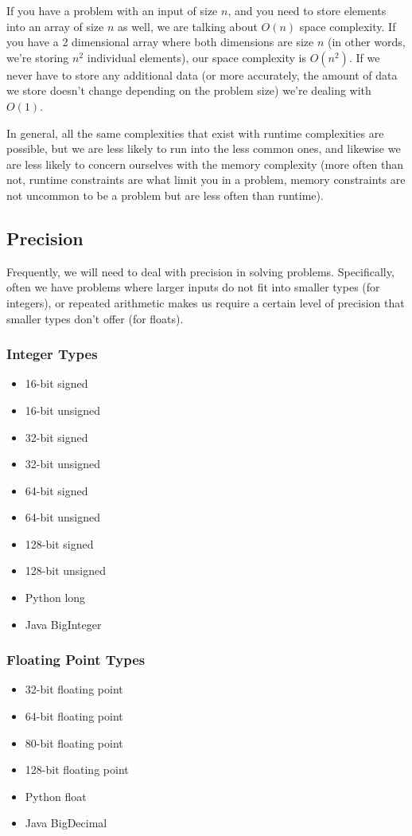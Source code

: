 If you have a problem with an input of size $n$, and you need to store elements into an array of size $n$ as well, we are talking about $O(n)$ space complexity. If you have a 2 dimensional array where both dimensions are size $n$ (in other words, we're storing $n^2$ individual elements), our space complexity is $O(n^2)$. If we never have to store any additional data (or more accurately, the amount of data we store doesn't change depending on the problem size) we're dealing with $O(1)$.

In general, all the same complexities that exist with runtime complexities are possible, but we are less likely to run into the less common ones, and likewise we are less likely to concern ourselves with the memory complexity (more often than not, runtime constraints are what limit you in a problem, memory constraints are not uncommon to be a problem but are less often than runtime).

\subsection{Precision}

Frequently, we will need to deal with precision in solving problems. Specifically, often we have problems where larger inputs do not fit into smaller types (for integers), or repeated arithmetic makes us require a certain level of precision that smaller types don't offer (for floats).

\subsubsection{Integer Types}

\begin{itemize}
\item 16-bit signed
\item 16-bit unsigned
\item 32-bit signed
\item 32-bit unsigned
\item 64-bit signed
\item 64-bit unsigned
\item 128-bit signed
\item 128-bit unsigned
\item Python long
\item Java BigInteger
\end{itemize}

\subsubsection{Floating Point Types}

\begin{itemize}
\item 32-bit floating point
\item 64-bit floating point
\item 80-bit floating point
\item 128-bit floating point
\item Python float
\item Java BigDecimal
\end{itemize}
